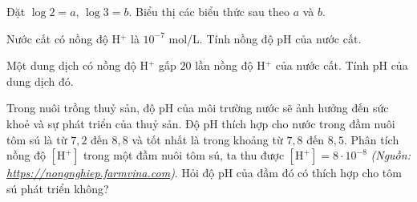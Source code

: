 \begin{bt}%
	Đặt $ \log 2=a $, $ \log 3=b $. Biểu thị các biểu thức sau theo $ a $ và $ b $.
\end{bt}

\begin{bt}%
	\begin{listEX}[1]
		\item[a)] Nước cất có nồng độ  H$^+ $ là $ 10^{-7} $ mol/L. Tính nồng độ pH của nước cất.
		\item[b)] Một dung dịch có nồng độ  H$^+ $ gấp $ 20 $ lần nồng độ  H$^+ $ của nước cất. Tính pH của dung dịch đó. 
	\end{listEX}
\end{bt}

\begin{bt}%
 
	Trong nuôi trồng thuỷ sản, độ $\mathrm{pH}$ của môi trường nước sẽ ảnh hưởng đến sức khoẻ và sự phát triển của thuỷ sản. Độ $\mathrm{pH}$ thích hợp cho nước trong đầm nuôi tôm sú là từ $7{,}2$ đến $8{,}8$ và tốt nhất là trong khoảng từ $7{,}8$ đến $8{,}5$. Phân tích nồng độ $\left[\mathrm{H}^{+}\right]$ trong một đầm nuôi tôm sú, ta thu được $\left[\mathrm{H}^{+}\right]=8 \cdot 10^{-8}$ \textit{(Nguồn: \href{https://nongnghiep.farmvina.com}{https://nongnghiep.farmvina.com})}. Hỏi độ pH của đầm đó có thích hợp cho tôm sú phát triển không?
\end{bt}

